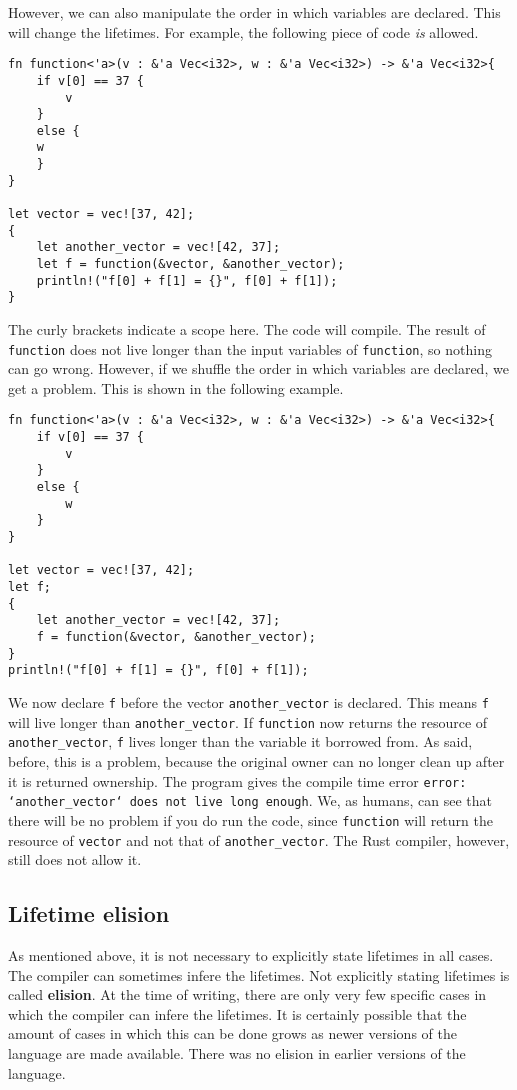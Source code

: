 However, we can also manipulate the order in which variables are declared. This will change the lifetimes. 
For example, the following piece of code \emph{is} allowed.

\begin{verbatim}
fn function<'a>(v : &'a Vec<i32>, w : &'a Vec<i32>) -> &'a Vec<i32>{
    if v[0] == 37 {
        v
    }
    else {
    w
    }
}

let vector = vec![37, 42];
{
    let another_vector = vec![42, 37];
    let f = function(&vector, &another_vector);
    println!("f[0] + f[1] = {}", f[0] + f[1]);
}
\end{verbatim}
The curly brackets indicate a scope here. The code will compile. The result of \verb|function| does not live longer than the input variables of \verb|function|, so nothing can go wrong. However, if we shuffle the order in which variables are declared, we get a problem. This is shown in the following example.

\begin{verbatim}
fn function<'a>(v : &'a Vec<i32>, w : &'a Vec<i32>) -> &'a Vec<i32>{
    if v[0] == 37 {
        v
    }
    else {
        w
    }
}

let vector = vec![37, 42];
let f;
{
    let another_vector = vec![42, 37];
    f = function(&vector, &another_vector);
}
println!("f[0] + f[1] = {}", f[0] + f[1]);
\end{verbatim}

We now declare \verb|f| before the vector \verb|another_vector| is declared. This means \verb|f| will live longer than \verb|another_vector|. If \verb|function| now returns the resource of \verb|another_vector|, \verb|f| lives longer than the variable it borrowed from. As said, before, this is a problem, because the original owner can no longer clean up after it is returned ownership. The program gives the compile time error \texttt{error: `another\_vector` does not live long enough}. We, as humans, can see that there will be no problem if you do run the code, since \verb|function| will return the resource of \verb|vector| and not that of \verb|another_vector|. The Rust compiler, however, still does not allow it. 

\subsection{Lifetime elision}
As mentioned above, it is not necessary to explicitly state lifetimes in all cases. The compiler can sometimes infere the lifetimes. Not explicitly stating lifetimes is called \textbf{elision}. At the time of writing, there are only very few specific cases in which the compiler can infere the lifetimes. It is certainly possible that the amount of cases in which this can be done grows as newer versions of the language are made available. There was no elision in earlier versions of the language. 

